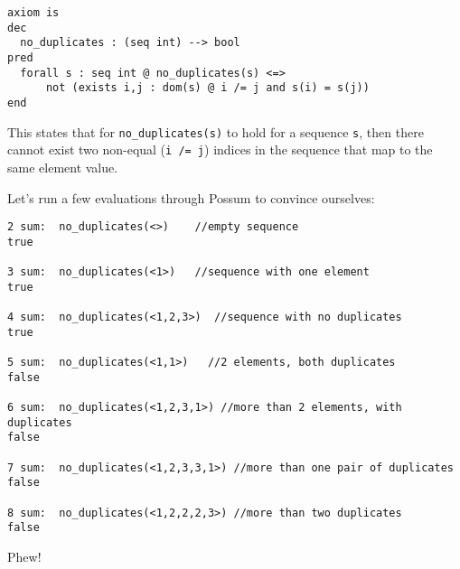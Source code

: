 \documentclass{article}
\begin{document}
\begin{enumerate}
\vspace{2mm}

\begin{lstlisting}
axiom is
dec
  no_duplicates : (seq int) --> bool
pred
  forall s : seq int @ no_duplicates(s) <=> 
      not (exists i,j : dom(s) @ i /= j and s(i) = s(j))
end
\end{lstlisting}

This states that for \texttt{no\_duplicates(s)} to hold for a sequence \texttt{s}, then there cannot exist two non-equal (\texttt{i /= j}) indices in the sequence that map to the same element value.

Let's run a few evaluations through Possum to convince ourselves:

\vspace{2mm}

\begin{lstlisting}
2 sum:  no_duplicates(<>)    //empty sequence
true

3 sum:  no_duplicates(<1>)   //sequence with one element
true

4 sum:  no_duplicates(<1,2,3>)  //sequence with no duplicates
true

5 sum:  no_duplicates(<1,1>)   //2 elements, both duplicates
false

6 sum:  no_duplicates(<1,2,3,1>) //more than 2 elements, with duplicates
false

7 sum:  no_duplicates(<1,2,3,3,1>) //more than one pair of duplicates
false

8 sum:  no_duplicates(<1,2,2,2,3>) //more than two duplicates
false
\end{lstlisting}

Phew!

\end{enumerate}
\end{document}
